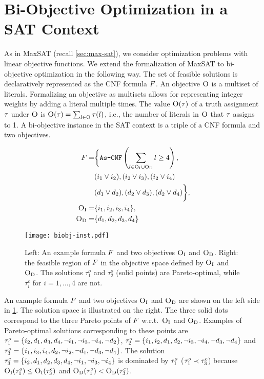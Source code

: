 \section{Bi-Objective Optimization in a SAT Context\label{sec:biopt}}

As in MaxSAT (recall \cref{sec:max-sat}), we consider optimization problems with linear objective functions.
We extend the formalization of MaxSAT to bi-objective optimization in the following way.
The set of feasible solutions is declaratively represented as the CNF formula $F$.
An objective $\textsc{O}$ is a multiset of literals.
Formalizing an objective as multisets allows for representing integer weights by adding a literal multiple times.
The value $\textsc{O}(\tau)$ of a truth assignment $\tau$ under $\textsc{O}$ is $\textsc{O}(\tau) = \sum_{l \in \textsc{O}} \tau(l)$, i.e., the number of literals in $\textsc{O}$ that $\tau$ assigns to 1. 
A bi-objective instance in the SAT context is a triple of a CNF formula and two objectives.

\begin{figure}
  \begin{minipage}{0.377\textwidth}
    \small
    \begin{align*}
      F = &\bigg\{ \texttt{As-CNF}\left(\sum_ {l \in \textsc{O}_{\text{I}} \cup \textsc{O}_{\text{D}}} l \geq 4 \right), \\
        &(i_1 \lor i_2), (i_2 \lor i_3), (i_2 \lor i_4) \\
        &(d_1 \lor d_2), (d_2 \lor d_3), (d_2 \lor d_4) \bigg\}, \\
      \textsc{O}_{\text{I}} =&\{ i_1, i_2, i_3, i_4 \}, \\
      \textsc{O}_{\text{D}} =&\{ d_1, d_2, d_3, d_4 \} 
    \end{align*}
  \end{minipage}
  \;
  \begin{minipage}{0.605\textwidth}
    \texttt{[image: biobj-inst.pdf]}
  \end{minipage}
  \caption{Left: An example formula $F$ and two objectives $\textsc{O}_{\text{I}}$ and $\textsc{O}_{\text{D}}$.
    Right: the feasible region of $F$ in the objective space defined by $\textsc{O}_{\text{I}}$ and $\textsc{O}_{\text{D}}$.
    The solutions $\tau^o_1$ and $\tau^o_2$ (solid points) are Pareto-optimal, while $\tau^c_i$ for $i=1,\ldots,4$ are not.\label{fig:biobj-inst}}
\end{figure}

\begin{example}\label{ex:main}
  An example formula $F$ and two objectives $\textsc{O}_{\text{I}}$ and $\textsc{O}_{\text{D}}$ are shown on the left side in \cref{fig:biobj-inst}. 
  The solution space is illustrated on the right.
  The three solid dots correspond to the three Pareto points of $F$ w.r.t.\ $\textsc{O}_{\text{I}}$ and $\textsc{O}_{\text{D}}$. 
  Examples of Pareto-optimal solutions corresponding to these points are $\tau^o_1 = \{i_2,\allowbreak d_1,\allowbreak d_3,\allowbreak d_4,\allowbreak \lnot i_1,\allowbreak \lnot i_3,\allowbreak \lnot i_4,\allowbreak \lnot d_2\}$, $\tau^o_2 = \{i_1,\allowbreak i_2,\allowbreak d_1,\allowbreak d_2,\allowbreak \lnot i_3,\allowbreak \lnot i_4,\allowbreak \lnot d_3,\allowbreak \lnot d_4\}$ and $\tau^o_3 = \{i_1,\allowbreak i_3,\allowbreak i_4,\allowbreak d_2,\allowbreak \lnot i_2,\allowbreak \lnot d_1,\allowbreak \lnot d_3,\allowbreak \lnot d_4\}$.
  The solution $\tau^c_3 = \{i_2,\allowbreak d_1,\allowbreak d_2,\allowbreak d_3,\allowbreak d_4,\allowbreak \lnot i_1,\allowbreak \lnot i_3,\allowbreak \lnot i_4\}$ is dominated by $\tau^o_1$ ($\tau^o_1 \prec \tau^c_3$) because $\textsc{O}_{\text{I}}(\tau^o_1) \leq \textsc{O}_{\text{I}}(\tau^c_3)$ and $\textsc{O}_{\text{D}}(\tau^o_1) < \textsc{O}_{\text{D}}(\tau^c_3)$.
\end{example}

